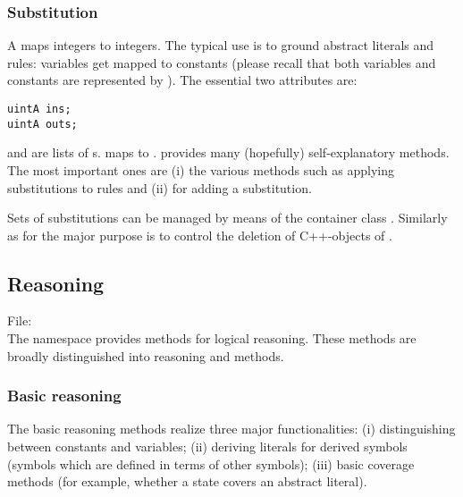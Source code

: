 \documentclass[10pt,twoside,twocolumn,fleqn]{article}
\begin{document}
\subsubsection{Substitution}

A  maps integers to integers. The typical use is to
ground abstract literals and rules: variables get mapped to constants
(please recall that both variables and constants are represented by
). The essential two attributes are:
\begin{lstlisting}
uintA ins;
uintA outs;
\end{lstlisting}
 and  are lists of s.  maps to
.  provides many (hopefully)
self-explanatory methods. The most important ones are (i) the various
 methods such as applying substitutions to rules and (ii)
 for adding a substitution.

Sets of substitutions can be managed by means of the container class
. Similarly as for  the major purpose
is to control the deletion of C++-objects of .

  





\subsection{Reasoning}

File: \\

The namespace  provides methods for logical reasoning. These
methods are broadly distinguished into  reasoning and
 methods.


\subsubsection{Basic reasoning}

The basic reasoning methods realize three major functionalities: (i)
distinguishing between constants and variables; (ii) deriving literals for
derived symbols (symbols which are defined in terms of other symbols);
(iii) basic coverage methods (for example, whether a state covers an
abstract literal).
\end{document}
